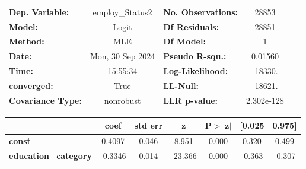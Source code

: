 \begin{center}
\begin{tabular}{lclc}
\toprule
\textbf{Dep. Variable:}      & employ\_Status2  & \textbf{  No. Observations:  } &    28853    \\
\textbf{Model:}              &      Logit       & \textbf{  Df Residuals:      } &    28851    \\
\textbf{Method:}             &       MLE        & \textbf{  Df Model:          } &        1    \\
\textbf{Date:}               & Mon, 30 Sep 2024 & \textbf{  Pseudo R-squ.:     } &  0.01560    \\
\textbf{Time:}               &     15:55:34     & \textbf{  Log-Likelihood:    } &   -18330.   \\
\textbf{converged:}          &       True       & \textbf{  LL-Null:           } &   -18621.   \\
\textbf{Covariance Type:}    &    nonrobust     & \textbf{  LLR p-value:       } & 2.302e-128  \\
\bottomrule
\end{tabular}
\begin{tabular}{lcccccc}
                             & \textbf{coef} & \textbf{std err} & \textbf{z} & \textbf{P$> |$z$|$} & \textbf{[0.025} & \textbf{0.975]}  \\
\midrule
\textbf{const}               &       0.4097  &        0.046     &     8.951  &         0.000        &        0.320    &        0.499     \\
\textbf{education\_category} &      -0.3346  &        0.014     &   -23.366  &         0.000        &       -0.363    &       -0.307     \\
\bottomrule
\end{tabular}
\end{center}